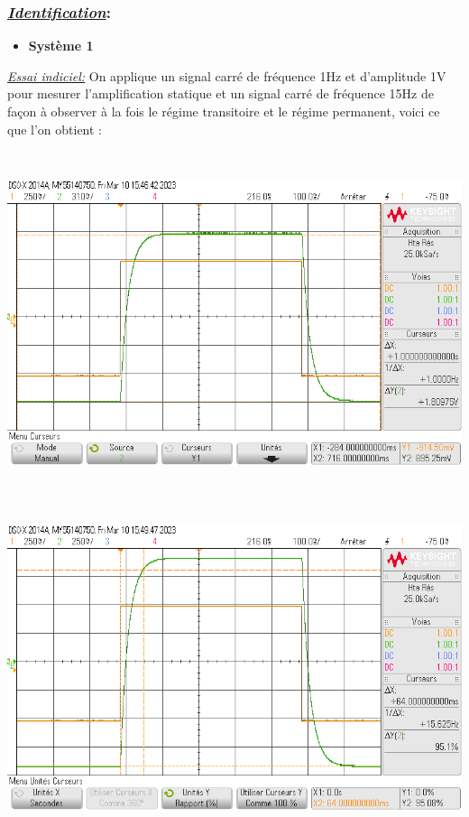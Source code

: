 \documentclass[12pt]{article}
\begin{document}
\subsubsection{\underline{\itshape Identification}:}
\begin{itemize}
    \item \bf \large Système 1
\end{itemize}
\textit{\underline{Essai indiciel:}} On applique un signal carré de fréquence 1Hz et d'amplitude 1V pour mesurer l'amplification statique et un signal carré de fréquence 15Hz de façon à observer à la fois le régime transitoire et le régime permanent, voici ce que l'on obtient :
\begin{center}
    \includegraphics[width = 17 cm, height = 10cm]{TP1/Syst_1/Ampli_statique__syst_1.png}
    \includegraphics[width = 17 cm, height = 10cm]{TP1/Syst_1/tr5prct_syst_1_indiciel.png}
\end{center}
\end{document}
